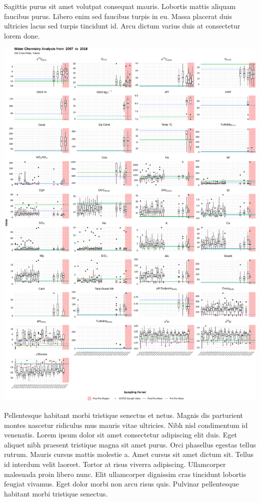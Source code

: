 \documentclass[30pt,extrafontsizes]{memoir}
\begin{document}
\begin{multicols*}{3}
{Sagittis purus sit amet volutpat consequat mauris. Lobortis mattis
aliquam faucibus purus. Libero enim sed faucibus turpis in eu. Massa
placerat duis ultricies lacus sed turpis tincidunt id. Arcu dictum
varius duis at consectetur lorem done.

\begin{center}\includegraphics[width=0.8\linewidth]{Figures/figure2} \end{center}

Pellentesque habitant morbi tristique senectus et netus. Magnis dis
parturient montes nascetur ridiculus mus mauris vitae ultricies. Nibh
nisl condimentum id venenatis. Lorem ipsum dolor sit amet consectetur
adipiscing elit duis. Eget aliquet nibh praesent tristique magna sit
amet purus. Orci phasellus egestas tellus rutrum. Mauris cursus mattis
molestie a. Amet cursus sit amet dictum sit. Tellus id interdum velit
laoreet. Tortor at risus viverra adipiscing. Ullamcorper malesuada proin
libero nunc. Elit ullamcorper dignissim cras tincidunt lobortis feugiat
vivamus. Eget dolor morbi non arcu risus quis. Pulvinar pellentesque
habitant morbi tristique senectus.

}
\end{multicols*}
\end{document}
